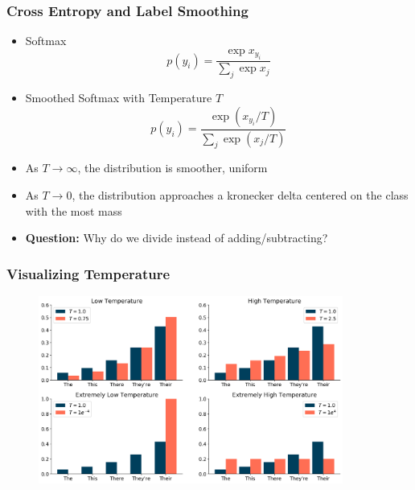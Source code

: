 \documentclass[usenames,dvipsnames]{beamer}
\begin{document}
\begin{frame}
\frametitle{Cross Entropy and Label Smoothing}
\begin{itemize}
  \item Softmax
  \begin{equation*}
    p(y_i) = \frac{\exp x_{y_i}}{\sum_j \exp x_j}
  \end{equation*}
  \item Smoothed Softmax with Temperature $T$
  \begin{equation*}
    p(y_i) = \frac{\exp \left(x_{y_i} / T \right)}{\sum_j \exp \left(x_j / T \right)}
  \end{equation*}
  \item As $T \to \infty$, the distribution is smoother, uniform
  \item As $T \to 0$, the distribution approaches a kronecker delta centered on the class with the most mass
  \item \textbf{Question:} Why do we divide instead of adding/subtracting?
\end{itemize}
\end{frame}

\begin{frame}
\frametitle{Visualizing Temperature}
\begin{figure}
  \centering
  \includegraphics[width=10cm]{assets/temperature}
\end{figure}
\end{frame}

\end{document}

